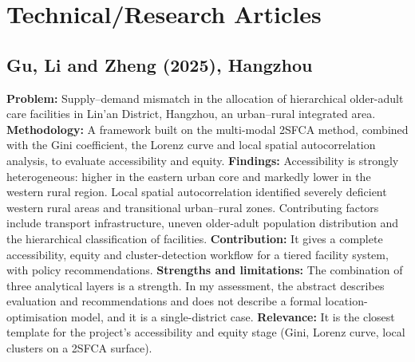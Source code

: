 \documentclass[journal]{IEEEtran}
\begin{document}
\section{Technical/Research Articles}
\label{sec:technical}

\subsection{Gu, Li and Zheng (2025), Hangzhou \cite{eldercare2025}}
\textbf{Problem:} Supply--demand mismatch in the allocation of hierarchical older-adult care facilities in Lin'an District, Hangzhou, an urban--rural integrated area.
\textbf{Methodology:} A framework built on the multi-modal 2SFCA method, combined with the Gini coefficient, the Lorenz curve and local spatial autocorrelation analysis, to evaluate accessibility and equity.
\textbf{Findings:} Accessibility is strongly heterogeneous: higher in the eastern urban core and markedly lower in the western rural region. Local spatial autocorrelation identified severely deficient western rural areas and transitional urban--rural zones. Contributing factors include transport infrastructure, uneven older-adult population distribution and the hierarchical classification of facilities.
\textbf{Contribution:} It gives a complete accessibility, equity and cluster-detection workflow for a tiered facility system, with policy recommendations.
\textbf{Strengths and limitations:} The combination of three analytical layers is a strength. In my assessment, the abstract describes evaluation and recommendations and does not describe a formal location-optimisation model, and it is a single-district case.
\textbf{Relevance:} It is the closest template for the project's accessibility and equity stage (Gini, Lorenz curve, local clusters on a 2SFCA surface).
\end{document}
